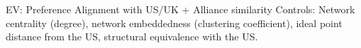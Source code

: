 
	EV: Preference Alignment with US/UK + Alliance similarity
	Controls: Network centrality (degree), network embeddedness (clustering coefficient), ideal point distance from the US, structural equivalence with the US.